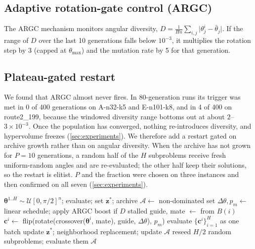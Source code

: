 \subsection{Adaptive rotation-gate control (ARGC)}
The ARGC mechanism monitors angular diversity,
$D=\frac{1}{Hn}\sum_{i,j}\lvert\theta^i_j-\bar\theta_j\rvert$. If the range of $D$
over the last 10 generations falls below $10^{-3}$, it multiplies the rotation
step by 3 (capped at $\theta_{\max}$) and the mutation rate by 5 for that
generation.

\subsection{Plateau-gated restart}
We found that ARGC almost never fires. In 80-generation runs its trigger was met
in 0 of 400 generations on A-n32-k5 and E-n101-k8, and in 4 of 400 on
route2\_199, because the windowed diversity range bottoms out at about
$2$--$3\times10^{-3}$. Once the population has converged, nothing re-introduces
diversity, and hypervolume freezes (\cref{sec:experiments}). We therefore add a
restart gated on archive growth rather than on angular diversity. When the
archive has not grown for $P=10$ generations, a random half of the $H$
subproblems receive fresh uniform-random angles and are re-evaluated; the other
half keep their solutions, so the restart is elitist. $P$ and the fraction were
chosen on three instances and then confirmed on all seven
(\cref{sec:experiments}).

\begin{algorithm}[t]
\caption{HQIEA-ARGC (one run)}
\label{alg:hqiea}
\small
\begin{algorithmic}[1]
\State $\boldsymbol\theta^{1..H}\sim\mathcal U[0,\pi/2]^n$; evaluate; set
  $\mathbf z^\ast$; archive $\mathcal A\gets$ non-dominated set
  \State $\Delta\theta,p_m\gets$ linear schedule; apply ARGC boost if $D$ stalled
   
    \State guide, mate $\gets$ from $B(i)$
    \State $\mathbf c^i\gets$ flip(rotate(crossover($\boldsymbol\theta^i$, mate),
      guide, $\Delta\theta$), $p_m$)
  \EndFor
  \State evaluate $\{\mathbf c^i\}_{i=1}^H$ as one batch 
  \State update $\mathbf z^\ast$; neighborhood replacement; update $\mathcal A$
    \State reseed $H/2$ random subproblems; evaluate them
  \EndIf
\EndFor
\State \Return $\mathcal A$
\end{algorithmic}
\end{algorithm}
